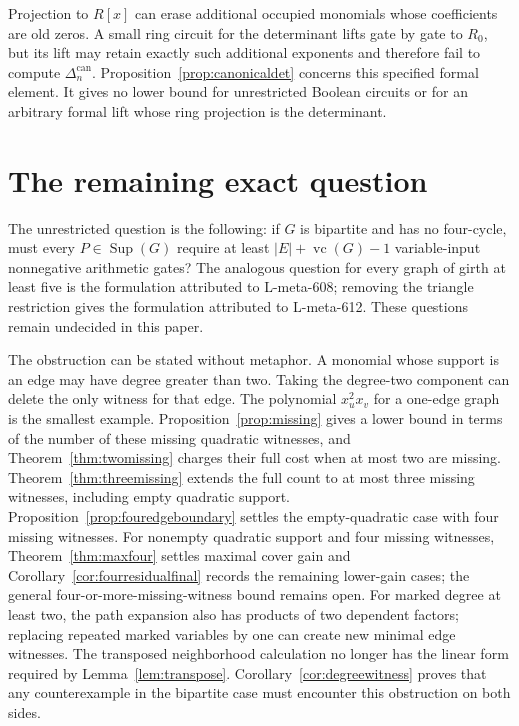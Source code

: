 \documentclass[11pt]{article}
\newcommand{\Sup}{\operatorname{Sup}}
\newcommand{\vc}{\operatorname{vc}}
\theoremstyle{definition}
\theoremstyle{remark}
\begin{document}
Projection to $R[x]$ can erase additional occupied monomials whose coefficients are old zeros. A small ring circuit for the determinant lifts gate by gate to $R_0$, but its lift may retain exactly such additional exponents and therefore fail to compute $\Delta_n^{\mathrm{can}}$. Proposition~\ref{prop:canonicaldet} concerns this specified formal element. It gives no lower bound for unrestricted Boolean circuits or for an arbitrary formal lift whose ring projection is the determinant.

\section{The remaining exact question}
The unrestricted question is the following: if $G$ is bipartite and has no four-cycle, must every $P\in\Sup(G)$ require at least $|E|+\vc(G)-1$ variable-input nonnegative arithmetic gates? The analogous question for every graph of girth at least five is the formulation attributed to L-meta-608; removing the triangle restriction gives the formulation attributed to L-meta-612. These questions remain undecided in this paper.

The obstruction can be stated without metaphor. A monomial whose support is an edge may have degree greater than two. Taking the degree-two component can delete the only witness for that edge. The polynomial $x_u^2x_v$ for a one-edge graph is the smallest example. Proposition~\ref{prop:missing} gives a lower bound in terms of the number of these missing quadratic witnesses, and Theorem~\ref{thm:twomissing} charges their full cost when at most two are missing. Theorem~\ref{thm:threemissing} extends the full count to at most three missing witnesses, including empty quadratic support. Proposition~\ref{prop:fouredgeboundary} settles the empty-quadratic case with four missing witnesses. For nonempty quadratic support and four missing witnesses, Theorem~\ref{thm:maxfour} settles maximal cover gain and Corollary~\ref{cor:fourresidualfinal} records the remaining lower-gain cases; the general four-or-more-missing-witness bound remains open. For marked degree at least two, the path expansion also has products of two dependent factors; replacing repeated marked variables by one can create new minimal edge witnesses. The transposed neighborhood calculation no longer has the linear form required by Lemma~\ref{lem:transpose}. Corollary~\ref{cor:degreewitness} proves that any counterexample in the bipartite case must encounter this obstruction on both sides.
\end{document}
